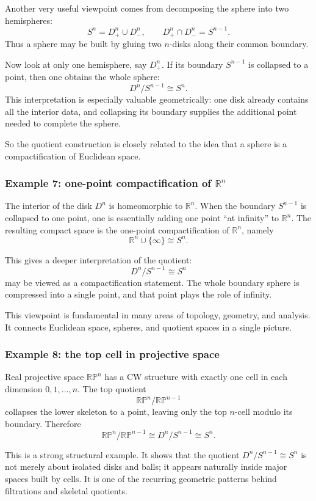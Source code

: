\documentclass[12pt,a4paper]{article}
\theoremstyle{notespace}
\begin{document}
Another very useful viewpoint comes from decomposing the sphere into two hemispheres:
\[
S^n = D^n_+ \cup D^n_-,
\qquad
D^n_+ \cap D^n_- = S^{n-1}.
\]
Thus a sphere may be built by gluing two \(n\)-disks along their common boundary.

Now look at only one hemisphere, say \(D^n_+\). If its boundary \(S^{n-1}\) is collapsed to a point, then one obtains the whole sphere:
\[
D^n/S^{n-1}\cong S^n.
\]
This interpretation is especially valuable geometrically: one disk already contains all the interior data, and collapsing its boundary supplies the additional point needed to complete the sphere.

So the quotient construction is closely related to the idea that a sphere is a compactification of Euclidean space.

\subsubsection*{Example 7: one-point compactification of \(\mathbb R^n\)}

The interior of the disk \(D^n\) is homeomorphic to \(\mathbb R^n\). When the boundary \(S^{n-1}\) is collapsed to one point, one is essentially adding one point ``at infinity'' to \(\mathbb R^n\). The resulting compact space is the one-point compactification of \(\mathbb R^n\), namely
\[
\mathbb R^n\cup\{\infty\}\cong S^n.
\]

This gives a deeper interpretation of the quotient:
\[
D^n/S^{n-1}\cong S^n
\]
may be viewed as a compactification statement. The whole boundary sphere is compressed into a single point, and that point plays the role of infinity.

This viewpoint is fundamental in many areas of topology, geometry, and analysis. It connects Euclidean space, spheres, and quotient spaces in a single picture.

\subsubsection*{Example 8: the top cell in projective space}

Real projective space \(\mathbb{RP}^n\) has a CW structure with exactly one cell in each dimension \(0,1,\dots,n\). The top quotient
\[
\mathbb{RP}^n/\mathbb{RP}^{n-1}
\]
collapses the lower skeleton to a point, leaving only the top \(n\)-cell modulo its boundary. Therefore
\[
\mathbb{RP}^n/\mathbb{RP}^{n-1}\cong D^n/S^{n-1}\cong S^n.
\]

This is a strong structural example. It shows that the quotient \(D^n/S^{n-1}\cong S^n\) is not merely about isolated disks and balls; it appears naturally inside major spaces built by cells. It is one of the recurring geometric patterns behind filtrations and skeletal quotients.
\end{document}
